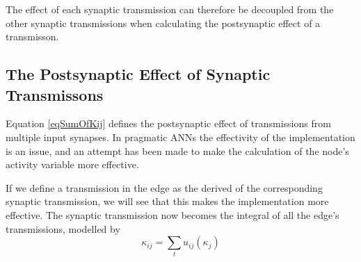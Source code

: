 		The effect of each synaptic transmission can therefore be decoupled from the other synaptic transmissions when calculating the postsynaptic effect of a transmisson.






		

		\subsection{The Postsynaptic Effect of Synaptic Transmissons}
			\label{ssecSynInputToANodeKANN}
			Equation \eqref{eqSumOfKij} defines the postsynaptic effect of transmissions from multiple input synapses.
			In pragmatic ANNs the effectivity of the implementation is an issue, and an attempt has been made to make the calculation of the node's activity variable more effective.
			
			If we define a transmission in the edge as the derived of the corresponding synaptic transmission, we will see that this makes the implementation more effective.
			The synaptic transmission now becomes the integral of all the edge's transmissions, modelled by %
			\begin{equation}
				\kappa_{ij} = \sum_t{u_{ij}(\kappa_j)}
				\label{eqSynapticTransmissionAsSumOfEdgeTransmissions}
			\end{equation}
			
